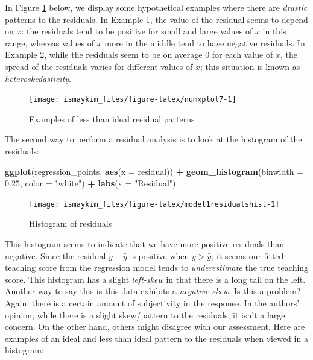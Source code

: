 \documentclass[12pt,]{krantz}
\makeatletter
\newenvironment{Shaded}{\begin{snugshade}}{\end{snugshade}}
\newcommand{\KeywordTok}[1]{\textcolor[rgb]{0.27,0.27,0.27}{\textbf{#1}}}
\newcommand{\DataTypeTok}[1]{\textcolor[rgb]{0.27,0.27,0.27}{#1}}
\newcommand{\FloatTok}[1]{\textcolor[rgb]{0.06,0.06,0.06}{#1}}
\newcommand{\StringTok}[1]{\textcolor[rgb]{0.5,0.5,0.5}{#1}}
\newcommand{\OperatorTok}[1]{\textcolor[rgb]{0.43,0.43,0.43}{\textbf{#1}}}
\newcommand{\NormalTok}[1]{#1}
\newenvironment{kframe}{%
\medskip{}
\setlength{\fboxsep}{.8em}
 \def\at@end@of@kframe{}%
 \ifinner\ifhmode%
  \def\at@end@of@kframe{\end{minipage}}%
  \begin{minipage}{\columnwidth}%
 \fi\fi%
 \def\FrameCommand##1{\hskip\@totalleftmargin \hskip-\fboxsep
 \colorbox{shadecolor}{##1}\hskip-\fboxsep
     \hskip-\linewidth \hskip-\@totalleftmargin \hskip\columnwidth}%
 \MakeFramed {\advance\hsize-\width
   \@totalleftmargin\z@ \linewidth\hsize
   \@setminipage}}%
 {\par\unskip\endMakeFramed%
 \at@end@of@kframe}
\renewenvironment{Shaded}{\begin{kframe}}{\end{kframe}}
\makeatother
\begin{document}
In Figure \ref{fig:numxplot7} below, we display some hypothetical
examples where there are \emph{drastic} patterns to the residuals. In
Example 1, the value of the residual seems to depend on \(x\): the
residuals tend to be positive for small and large values of \(x\) in
this range, whereas values of \(x\) more in the middle tend to have
negative residuals. In Example 2, while the residuals seem to be on
average 0 for each value of \(x\), the spread of the residuals varies
for different values of \(x\); this situation is known as
\emph{heteroskedasticity}.

\begin{figure}

{\centering \texttt{[image: ismaykim\_files/figure-latex/numxplot7-1]} 

}

\caption{Examples of less than ideal residual patterns}\label{fig:numxplot7}
\end{figure}

The second way to perform a residual analysis is to look at the
histogram of the residuals:

\begin{Shaded}
\begin{Highlighting}[]
\KeywordTok{ggplot}\NormalTok{(regression_points, }\KeywordTok{aes}\NormalTok{(}\DataTypeTok{x =}\NormalTok{ residual)) }\OperatorTok{+}
\StringTok{  }\KeywordTok{geom_histogram}\NormalTok{(}\DataTypeTok{binwidth =} \FloatTok{0.25}\NormalTok{, }\DataTypeTok{color =} \StringTok{"white"}\NormalTok{) }\OperatorTok{+}
\StringTok{  }\KeywordTok{labs}\NormalTok{(}\DataTypeTok{x =} \StringTok{"Residual"}\NormalTok{)}
\end{Highlighting}
\end{Shaded}

\begin{figure}

{\centering \texttt{[image: ismaykim\_files/figure-latex/model1residualshist-1]} 

}

\caption{Histogram of residuals}\label{fig:model1residualshist}
\end{figure}

This histogram seems to indicate that we have more positive residuals
than negative. Since the residual \(y-\widehat{y}\) is positive when
\(y > \widehat{y}\), it seems our fitted teaching score from the
regression model tends to \emph{underestimate} the true teaching score.
This histogram has a slight \emph{left-skew} in that there is a long
tail on the left. Another way to say this is this data exhibits a
\emph{negative skew}. Is this a problem? Again, there is a certain
amount of subjectivity in the response. In the authors' opinion, while
there is a slight skew/pattern to the residuals, it isn't a large
concern. On the other hand, others might disagree with our assessment.
Here are examples of an ideal and less than ideal pattern to the
residuals when viewed in a histogram:
\end{document}
